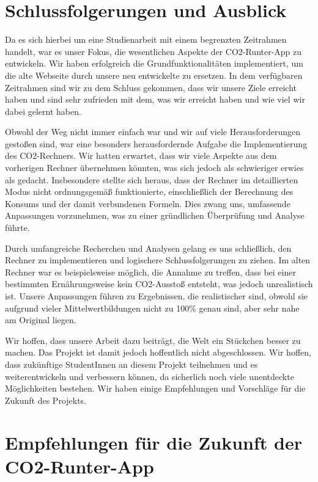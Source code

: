 
\section{Schlussfolgerungen und Ausblick}

Da es sich hierbei um eine Studienarbeit mit einem begrenzten Zeitrahmen handelt, war es unser Fokus, die wesentlichen Aspekte der CO2-Runter-App zu entwickeln. Wir haben erfolgreich die Grundfunktionalitäten implementiert, um die alte Webseite durch unsere neu entwickelte zu ersetzen. In dem verfügbaren Zeitrahmen sind wir zu dem Schluss gekommen, dass wir unsere Ziele erreicht haben und sind sehr zufrieden mit dem, was wir erreicht haben und wie viel wir dabei gelernt haben.

Obwohl der Weg nicht immer einfach war und wir auf viele Herausforderungen gestoßen sind, war eine besonders herausfordernde Aufgabe die Implementierung des CO2-Rechners. Wir hatten erwartet, dass wir viele Aspekte aus dem vorherigen Rechner übernehmen könnten, was sich jedoch als schwieriger erwies als gedacht. Insbesondere stellte sich heraus, dass der Rechner im detaillierten Modus nicht ordnungsgemäß funktionierte, einschließlich der Berechnung des Konsums und der damit verbundenen Formeln. Dies zwang uns, umfassende Anpassungen vorzunehmen, was zu einer gründlichen Überprüfung und Analyse führte.

Durch umfangreiche Recherchen und Analysen gelang es uns schließlich, den Rechner zu implementieren und logischere Schlussfolgerungen zu ziehen. Im alten Rechner war es beispielsweise möglich, die Annahme zu treffen, dass bei einer bestimmten Ernährungsweise kein CO2-Ausstoß entsteht, was jedoch unrealistisch ist. Unsere Anpassungen führen zu Ergebnissen, die realistischer sind, obwohl sie aufgrund vieler Mittelwertbildungen nicht zu 100\% genau sind, aber sehr nahe am Original liegen.

Wir hoffen, dass unsere Arbeit dazu beiträgt, die Welt ein Stückchen besser zu machen. Das Projekt ist damit jedoch hoffentlich nicht abgeschlossen. Wir hoffen, dass zukünftige StudentInnen an diesem Projekt teilnehmen und es weiterentwickeln und verbessern können, da sicherlich noch viele unentdeckte Möglichkeiten bestehen. Wir haben einige Empfehlungen und Vorschläge für die Zukunft des Projekts.

\section{Empfehlungen für die Zukunft der CO2-Runter-App}

